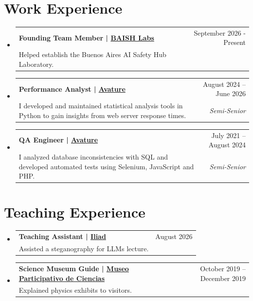 \documentclass[letterpaper,11pt]{article}
\makeatletter
\newcommand{\resumeItem}[4]{
  \vspace{-2pt}\item
    \begin{tabular*}{\textwidth}[t]{l@{\extracolsep{\fill}}r}
      \textbf{#1} & #2 \\
      {\parbox[t]{0.7\textwidth}{\small#3}} & \textit{\small \textcolor{mygray}{#4}} \\
    \end{tabular*}\vspace{-7pt}
}
\newcommand{\resumeSectionStart}{\begin{itemize}[leftmargin=0pt, label={}]}
\newcommand{\resumeSectionEnd}{\end{itemize}}
\makeatother
\begin{document}
\section{Work Experience}
  \resumeSectionStart
    \resumeItem
      {Founding Team Member | \href{https://www.baish.com.ar/en/research}{BAISH Labs}}
      {September 2026 - Present}
      {Helped establish the Buenos Aires AI Safety Hub Laboratory.}
      {}
    \resumeItem
      {Performance Analyst | \href{https://www.avature.net/}{Avature}}
      {August 2024 -- June 2026}
      {I developed and maintained statistical analysis tools in Python to gain insights from web server response times.}
      {Semi-Senior}
    \resumeItem
      {QA Engineer | \href{https://www.avature.net/}{Avature}}
      {July 2021 -- August 2024}
      {I analyzed database inconsistencies with SQL and developed automated tests using Selenium, JavaScript and PHP.}
      {Semi-Senior}
  \resumeSectionEnd

\section{Teaching Experience}
  \resumeSectionStart
    \resumeItem
      {Teaching Assistant | \href{https://www.iliad.ac/}{Iliad}}
      {August 2026}
      {Assisted a steganography for LLMs lecture.}
      {}
    \resumeItem
      {Science Museum Guide | \href{https://www.mpc.org.ar/}{Museo Participativo de Ciencias}}
      {October 2019 -- December 2019}
      {Explained physics exhibits to visitors.}
      {}
  \resumeSectionEnd


\end{document}
